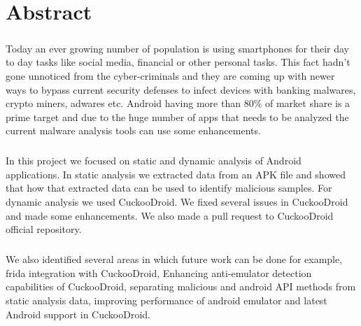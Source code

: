 \documentclass[../main.tex]{subfile}
\begin{document}
\chapter*{\centering Abstract}
	\paragraph{} Today an ever growing number of population is using smartphones for their day to day tasks like social media, financial or other personal tasks. This fact hadn't gone unnoticed from the cyber-criminals and they are coming up with newer ways to bypass current security defenses to infect devices with banking malwares, crypto miners, adwares etc. Android having more than 80\% of market share is a prime target and due to the huge number of apps that needs to be analyzed the current malware analysis tools can use some enhancements.
	
	\paragraph{} In this project we focused on static and dynamic analysis of Android applications. In static analysis we extracted data from an APK file and showed that how that extracted data can be used to identify malicious samples. For dynamic analysis we used CuckooDroid. We fixed several issues in CuckooDroid and made some enhancements. We also made a pull request to CuckooDroid official repository.
	
	\paragraph{} We also identified several areas in which future work can be done for example, frida integration with CuckooDroid, Enhancing anti-emulator detection capabilities of CuckooDroid, separating malicious and android API methods from static analysis data, improving performance of android emulator and latest Android support in CuckooDroid.
\end{document}
